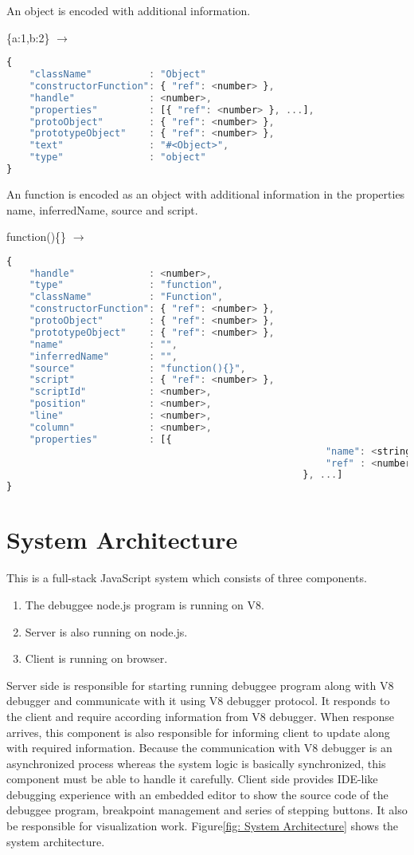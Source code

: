 An object is encoded with additional information.

\{a:1,b:2\} \(\rightarrow\)
\begin{lstlisting}[language=JavaScript]
{
	"className"          : "Object"
	"constructorFunction": { "ref": <number> },
	"handle"             : <number>,
	"properties"         : [{ "ref": <number> }, ...],
	"protoObject"        : { "ref": <number> },
	"prototypeObject"    : { "ref": <number> },
	"text"               : "#<Object>",
	"type"               : "object"
}
\end{lstlisting}

An function is encoded as an object with additional information in the properties name, inferredName, source and script.

function()\{\} \(\rightarrow\)
\begin{lstlisting}[language=JavaScript]
{
	"handle"             : <number>,
	"type"               : "function",
	"className"          : "Function",
	"constructorFunction": { "ref": <number> },
	"protoObject"        : { "ref": <number> },
	"prototypeObject"    : { "ref": <number> },
	"name"               : "",
	"inferredName"       : "",
	"source"             : "function(){}",
	"script"             : { "ref": <number> },
	"scriptId"           : <number>,
	"position"           : <number>,
	"line"               : <number>,
	"column"             : <number>,
	"properties"         : [{
														"name": <string>,
														"ref" : <number>
													}, ...]
}
\end{lstlisting}

\section {System Architecture}
This is a full-stack JavaScript system which consists of three components.

\begin{enumerate}
	\item The debuggee node.js program is running on V8.
	\item Server is also running on node.js.
	\item Client is running on browser. 
\end{enumerate}

Server side is responsible for starting running debuggee program along with V8 debugger and communicate with it using V8 debugger protocol. It responds to the client and require according information from V8 debugger. When response arrives, this component is also responsible for informing client to update along with required information. Because the communication with V8 debugger is an asynchronized process whereas the system logic is basically synchronized, this component must be able to handle it carefully. Client side provides IDE-like debugging experience with an embedded editor to show the source code of the debuggee program, breakpoint management and series of stepping buttons. It also be responsible for visualization work. Figure\ref{fig: System Architecture} shows the system architecture.

